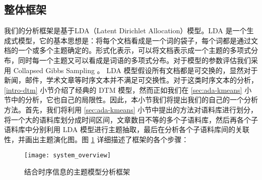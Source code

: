 \subsection{整体框架}
\label{sec:framework}
我们的分析框架是基于LDA（Latent Dirichlet Allocation）\cite{Blei:2003}模型。LDA 是一个生成式模型，它的基本思想是：将每个文档看成是一个词的袋子，每个词都是通过文档的一个或多个主题确定的。形式化表示，可以将文档表示成一个主题的多项式分布，同时每一个主题又可以看成是词语的多项式分布。对于模型的参数评估我们采用 Collapsed Gibbs Sampling \cite{griffiths2004finding, heinrich2005parameter}。 LDA 模型假设所有文档都是可交换的，显然对于新闻，邮件，学术文章等时序文本并不满足可交换性。对于这类时序文本的分析，\ref{intro-dtm} 小节介绍了经典的 DTM 模型，然而正如我们在 \ref{sec:ada-kmeans} 小节中的分析，它也自己的局限性。因此，本小节我们将提出我们的自己的一个分析方法。首先，我们将利用 \ref{sec:ada-kmeans} 小节中提出的方法对语料库进行划分，将一个大的语料库划分成时间区间，文章数目不等的多个子语料库，然后再各个子语料库中分别利用 LDA 模型进行主题抽取，最后在分析各个子语料库间的关联性，并画出主题演化图。图 \ref{system-overview} 详细描述了框架的各个步骤：
\begin{figure}[htb]
	\texttt{[image: system\_overview]}
	\caption{结合时序信息的主题模型分析框架}
	\label{system-overview}
\end{figure}
